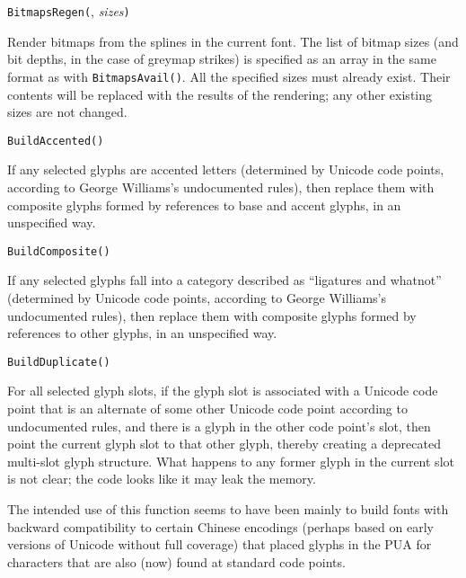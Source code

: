 

\texttt{BitmapsRegen(}, \textit{sizes}\texttt{)}

Render bitmaps from the splines in the current font.  The list of bitmap
sizes (and bit depths, in the case of greymap strikes) is specified as an
array in the same format as with \texttt{BitmapsAvail()}.  All the specified
sizes must already exist.  Their contents will be replaced with the results
of the rendering; any other existing sizes are not changed.



\texttt{BuildAccented()}

If any selected glyphs are accented letters (determined by Unicode code
points, according to George Williams's undocumented rules), then replace
them with composite glyphs formed by references to base and accent glyphs,
in an unspecified way.



\texttt{BuildComposite()}

If any selected glyphs fall into a category described as ``ligatures and
whatnot'' (determined by Unicode code points, according to George Williams's
undocumented rules), then replace them with composite glyphs formed by
references to other glyphs, in an unspecified way.



\texttt{BuildDuplicate()}

For all selected glyph slots, if the glyph slot is associated with a Unicode
code point that is an alternate of some other Unicode code point according
to undocumented rules, and there is a glyph in the other code point's slot,
then point the current glyph slot to that other glyph, thereby creating a
deprecated multi-slot glyph structure.  What happens to any former glyph in
the current slot is not clear; the code looks like it may leak the memory.

The intended use of this function seems to have been mainly to build
fonts with backward compatibility to certain Chinese encodings (perhaps
based on early versions of Unicode without full coverage) that placed glyphs
in the PUA for characters that are also (now) found at standard code points.

